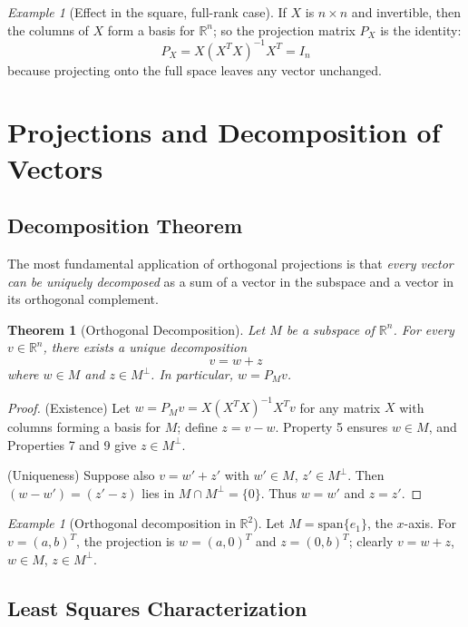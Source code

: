 \documentclass[12pt]{article}
\theoremstyle{definition}
\theoremstyle{plain}
\newtheorem{theorem}[definition]{Theorem}
\theoremstyle{remark}
\newtheorem{example}[definition]{Example}
\begin{document}
\begin{example}[Effect in the square, full-rank case]
    If $X$ is $n \times n$ and invertible, then the columns of $X$ form a basis for $\mathbb{R}^n$; so the projection matrix $P_X$ is the identity:
    \[
        P_X = X (X^T X)^{-1} X^T = I_n
    \]
    because projecting onto the full space leaves any vector unchanged.
\end{example}

\section{Projections and Decomposition of Vectors}

\subsection{Decomposition Theorem}

The most fundamental application of orthogonal projections is that \emph{every vector can be uniquely decomposed} as a sum of a vector in the subspace and a vector in its orthogonal complement.

\begin{theorem}[Orthogonal Decomposition]
    Let $M$ be a subspace of $\mathbb{R}^n$. For every $v \in \mathbb{R}^n$, there exists a unique decomposition
    \[
        v = w + z
    \]
    where $w \in M$ and $z \in M^\perp$. In particular, $w = P_M v$.
\end{theorem}

\begin{proof}
    \textsf{(Existence)} Let $w = P_M v = X (X^T X)^{-1} X^T v$ for any matrix $X$ with columns forming a basis for $M$; define $z = v - w$. Property 5 ensures $w \in M$, and Properties 7 and 9 give $z \in M^\perp$.

    \textsf{(Uniqueness)} Suppose also $v = w' + z'$ with $w' \in M$, $z' \in M^\perp$. Then $(w-w') = (z'-z)$ lies in $M \cap M^\perp = \{0\}$. Thus $w = w'$ and $z = z'$.
\end{proof}

\begin{example}[Orthogonal decomposition in $\mathbb{R}^2$]
    Let $M = \text{span}\{e_1\}$, the $x$-axis. For $v = (a, b)^T$, the projection is $w = (a, 0)^T$ and $z = (0, b)^T$; clearly $v = w + z$, $w \in M$, $z \in M^\perp$.
\end{example}

\subsection{Least Squares Characterization}
\end{document}

